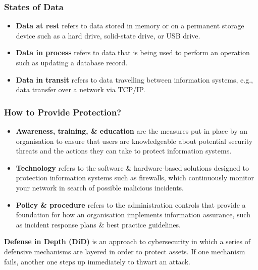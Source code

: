 \documentclass[a4paper,11pt]{article}
\begin{document}
\subsubsection{States of Data}
\begin{itemize}
    \item   \textbf{Data at rest} refers to data stored in memory or on a permanent storage device such as a hard drive, solid-state drive, or USB drive. 
    \item   \textbf{Data in process} refers to data that is being used to perform an operation such as updating a database record.
    \item   \textbf{Data in transit} refers to data travelling between information systems, e.g., data transfer over a network via TCP/IP.
\end{itemize}

\subsubsection{How to Provide Protection?}
\begin{itemize}
    \item   \textbf{Awareness, training, \& education} are the measures put in place by an organisation to ensure that users are knowledgeable about potential security threats and the actions they can take to protect information systems.

    \item   \textbf{Technology} refers to the software \& hardware-based solutions designed to protection information systems such as firewalls, which continuously monitor your network in search of possible malicious incidents.

    \item   \textbf{Policy \& procedure} refers to the administration controls that provide a foundation for how an organisation implements information assurance, such as incident response plans \& best practice guidelines.
\end{itemize}

\textbf{Defense in Depth (DiD)} is an approach to cybersecurity in which a series of defensive mechanisms are layered in order to protect assets.
If one mechanism fails, another one steps up immediately to thwart an attack.
\end{document}
